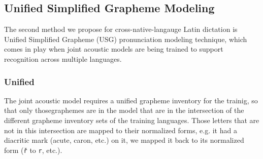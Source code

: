 \documentclass[runningheads,a4paper]{llncs}
\begin{document}
\subsection{Unified Simplified Grapheme Modeling}\label{usg}
The second method we propose for cross-native-langauge Latin dictation is Unified Simplified Grapheme (USG) pronunciation modeling technique, which comes in play when joint acoustic models are being trained to support recognition across multiple languages.
\subsubsection{Unified}
The joint acoustic model requires a unified grapheme inventory for the trainig, so that only thosegraphemes are in the model that are in the intersection of the different grapheme inventory sets of the training languages.
Those letters that are not in this intersection are mapped to their normalized forms, e.g. it had a diacritic mark (acute, caron, etc.) on it, we mapped it back to its normalized form (\texttt{\v{r}} to \texttt{r}, etc.).
\end{document}
